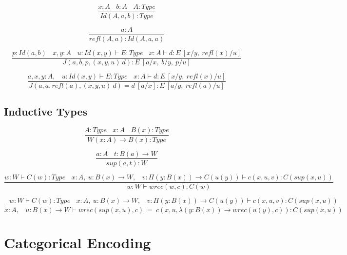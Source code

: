 \documentclass[11pt,oneside]{article}
\begin{document}
\begin{equation}
\tag{$Id$-formation}
\dfrac
  {x:A\ \ \ \ b:A\ \ \ \ A:Type}
  {Id(A,a,b) : Type}
\end{equation}

\begin{equation}
\tag{$Id$-intro}
\dfrac
  {a:A}
  {refl(A,a) : Id(A,a,a) }
\end{equation}

\begin{equation}
\tag{$J$-elimination}
\dfrac
  {p:Id(a,b)\ \ \ \ x,y:A\ \ \ \ u:Id(x,y) \vdash E:Type\ \ \ \ x:A \vdash d: E\ [x/y,\ refl(x)/u]}
  {J(a,b,p,(x,y,u)\ d) : E\ [a/x,\ b/y,\ p/u]}
\end{equation}

\begin{equation}
\tag{$Id$-computation}
\dfrac
  {a,x,y:A,\ \ \ \ u:Id(x,y) \vdash E:Type\ \ \ \ x:A \vdash d:E\ [x/y,\ refl(x)/u]}
  {J(a,a,refl(a),(x,y,u)\ d) = d\ [a/x] : E\ [a/y,\ refl(a)/u]}
\end{equation}

  \subsection{Inductive Types}

\begin{equation}
\tag{$W$-formation}
\dfrac
  {A:Type\ \ \ \ x:A\ \ \ \ B(x):Type}
  {W (x:A) \rightarrow B(x) : Type}
\end{equation}

\begin{equation}
\tag{$W$-intro}
\dfrac
  {a:A\ \ \ \ t: B(a) \rightarrow W}
  {sup(a,t) : W}
\end{equation}

\begin{equation}
\tag{$W$-elimination}
\dfrac
  {w: W \vdash C(w) : Type\ \ \ \ x:A,\ u:B(x) \rightarrow W,\ \ \ \ v:\Pi (y:B(x)) \rightarrow C(u(y)) \vdash c(x,u,v):C(sup(x,u))}
  {w:W \vdash wrec(w,c):C(w)}
\end{equation}

\begin{equation}
\tag{$W$-computation}
\dfrac
  {w: W \vdash C(w) : Type\ \ \ \ x:A,\ u:B(x) \rightarrow W,\ \ \ \ v:\Pi (y:B(x)) \rightarrow C(u(y)) \vdash c(x,u,v):C(sup(x,u))}
  {x:A,\ \ \ \ u:B(x) \rightarrow W \vdash wrec(sup(x,u),c)\ =\ c(x,u,\lambda (y:B(x)) \rightarrow wrec(u(y),c)):C(sup(x,u))}
\end{equation}
\newpage
\section{Categorical Encoding}
\end{document}
